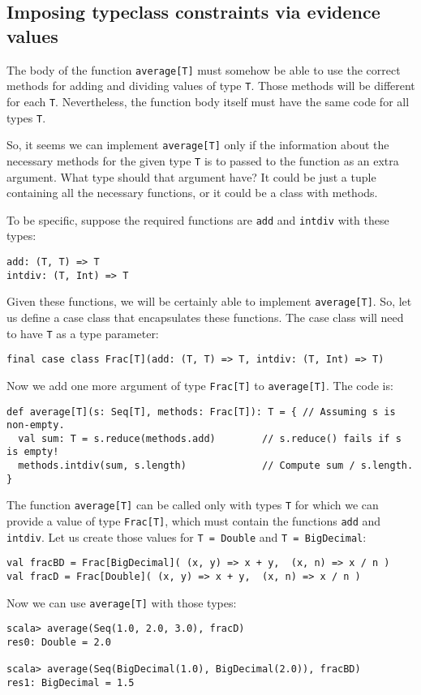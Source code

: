 \subsection{Imposing typeclass constraints via evidence values}

The body of the function \lstinline!average[T]! must somehow be able
to use the correct methods for adding and dividing values of type
\lstinline!T!. Those methods will be different for each \lstinline!T!.
Nevertheless, the function body itself must have the same code for
all types \lstinline!T!.

So, it seems we can implement \lstinline!average[T]! only if the
information about the necessary methods for the given type \lstinline!T!
is to passed to the function as an extra argument. What type should
that argument have? It could be just a tuple containing all the necessary
functions, or it could be a class with methods.

To be specific, suppose the required functions are \lstinline!add!
and \lstinline!intdiv! with these types:
\begin{lstlisting}
add: (T, T) => T
intdiv: (T, Int) => T
\end{lstlisting}
Given these functions, we will be certainly able to implement \lstinline!average[T]!.
So, let us define a case class that encapsulates these functions.
The case class will need to have \lstinline!T! as a type parameter:

\begin{lstlisting}
final case class Frac[T](add: (T, T) => T, intdiv: (T, Int) => T)
\end{lstlisting}
Now we add one more argument of type \lstinline!Frac[T]! to \lstinline!average[T]!.
The code is:
\begin{lstlisting}
def average[T](s: Seq[T], methods: Frac[T]): T = { // Assuming s is non-empty.
  val sum: T = s.reduce(methods.add)        // s.reduce() fails if s is empty!
  methods.intdiv(sum, s.length)             // Compute sum / s.length.
}
\end{lstlisting}

The function \lstinline!average[T]! can be called only with types
\lstinline!T! for which we can provide a value of type \lstinline!Frac[T]!,
which must contain the functions \lstinline!add! and \lstinline!intdiv!.
Let us create those values for \lstinline!T = Double! and \lstinline!T = BigDecimal!:
\begin{lstlisting}
val fracBD = Frac[BigDecimal]( (x, y) => x + y,  (x, n) => x / n )
val fracD = Frac[Double]( (x, y) => x + y,  (x, n) => x / n )
\end{lstlisting}
Now we can use \lstinline!average[T]! with those types:
\begin{lstlisting}
scala> average(Seq(1.0, 2.0, 3.0), fracD)
res0: Double = 2.0

scala> average(Seq(BigDecimal(1.0), BigDecimal(2.0)), fracBD)
res1: BigDecimal = 1.5
\end{lstlisting}

